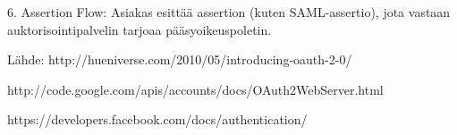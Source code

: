 \documentclass[finnish,gradu]{tktltiki}
\begin{document}
  6. Assertion Flow: Asiakas esittää assertion (kuten SAML-assertio), jota vastaan auktorisointipalvelin tarjoaa pääsyoikeuspoletin.

  Lähde: http://hueniverse.com/2010/05/introducing-oauth-2-0/



  http://code.google.com/apis/accounts/docs/OAuth2WebServer.html

  https://developers.facebook.com/docs/authentication/




\end{document}
